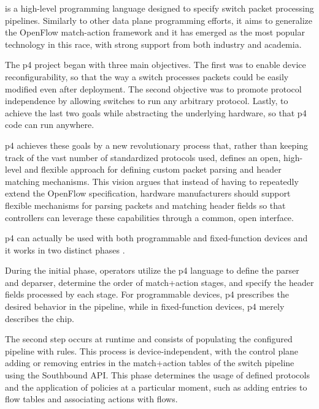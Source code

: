  is a high-level programming language designed to specify switch packet processing pipelines. Similarly to other data plane programming efforts, it aims to generalize the OpenFlow match-action framework and it has emerged as the most popular technology in this race, with strong support from both industry and academia\cite{hauser_survey_2021}.

The \gls{p4} project began with three main objectives\cite{bosshart_p4_2014}. The first was to enable device reconfigurability, so that the way a switch processes packets could be easily modified even after deployment. The second objective was to promote protocol independence by allowing switches to run any arbitrary protocol. Lastly, to achieve the last two goals while abstracting the underlying hardware, so that \gls{p4} code can run anywhere. 

\gls{p4} achieves these goals by a new revolutionary process that, rather than keeping track of the vast number of standardized protocols used, defines an open, high-level and flexible approach for defining custom packet parsing and header matching mechanisms. This vision argues that instead of having to repeatedly extend the OpenFlow specification, hardware manufacturers should support flexible mechanisms for parsing packets and matching header fields so that controllers can leverage these capabilities through a common, open interface. \cite{bosshart_p4_2014}

\gls{p4} can actually be used with both programmable and fixed-function devices\cite{peterson_software-defined_2021} and it works in two distinct phases \cite{bosshart_p4_2014}\cite{bifulco_survey_2018}. 

During the initial phase, operators utilize the \gls{p4} language to define the parser and deparser, determine the order of match+action stages, and specify the header fields processed by each stage. For programmable devices, \gls{p4} prescribes the desired behavior in the pipeline, while in fixed-function devices, \gls{p4} merely describes the chip. 

The second step occurs at runtime and consists of populating the configured pipeline with rules. This process is device-independent, with the control plane adding or removing entries in the match+action tables of the switch pipeline using the Southbound API. This phase determines the usage of defined protocols and the application of policies at a particular moment, such as adding entries to flow tables and associating actions with flows.

